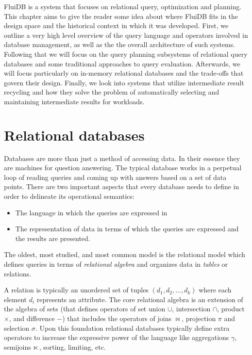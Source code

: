 
FluiDB is a system that focuses on relational query, optimization and
planning. This chapter aims to give the reader some idea about where
FluiDB fits in the design space and the historical context in which
it was developed.  First, we outline a very high level overview of the
query language and operators involved in database management, as well
as the the overall architecture of such systems. Following that we
will focus on the query planning subsystems of relational query
databases and some traditional approaches to query
evaluation. Afterwards, we will focus particularly on in-memory
relational databases and the trade-offs that govern their
design. Finally, we look into systems that utilize intermediate result
recycling and how they solve the problem of automatically selecting
and maintaining intermediate results for workloads.

\section{Relational databases}

Databases are more than just a method of accessing data. In their
essence they are machines for question answering. The typical database
works in a perpetual loop of reading queries and coming up with
answers based on a set of data points. There are two important aspects
that every database needs to define in order to delineate its
operational semantics:

\begin{itemize}
\item The language in which the queries are expressed in
\item The representation of data in terms of which the queries are
  expressed and the results are presented.
\end{itemize}

The oldest, most studied, and most common model is the relational model
which defines queries in terms of \emph{relational algebra} and organizes
data in \emph{tables} or relations.

A relation is typically an unordered set of tuples
\((d_1,d_2,...,d_k)\) where each element \(d_i\) represents an
attribute. The core relational algebra is an extension of the algebra
of sets (that defines operators of set union \(\cup\), intersection
\(\cap\), product \(\times\), and difference \(-\)) that includes the
operators of joins \(\Join\), projection \(\pi\) and selection
\(\sigma\). Upon this foundation relational databases typically define
extra operators to increase the expressive power of the language like
aggregations \(\gamma\), semijoins \(\ltimes\), sorting, limiting, etc.

